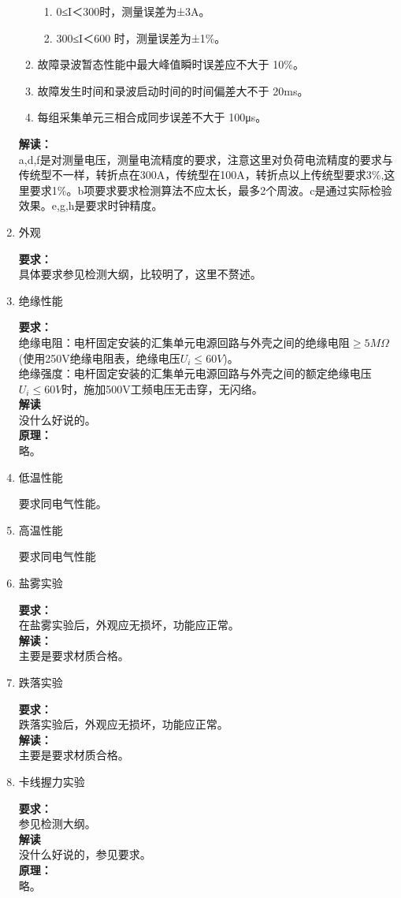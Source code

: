 \documentclass{article}
\begin{document}
\begin{CJK}{UTF8}{gbsn}
\begin{enumerate}
\begin{enumerate}
					\begin{enumerate}	
						\item 0≤I＜300时，测量误差为±3A。 
						\item 300≤I＜600 时，测量误差为±1\%。 
					\end{enumerate}
				\item 故障录波暂态性能中最大峰值瞬时误差应不大于 10\%。 
				\item 故障发生时间和录波启动时间的时间偏差大不于 20ms。 
				\item 每组采集单元三相合成同步误差不大于 100μs。 
		\end{enumerate}
		\textbf{解读：}\\
		a,d,f是对测量电压，测量电流精度的要求，注意这里对负荷电流精度的要求与传统型不一样，转折点在300A，传统型在100A，转折点以上传统型要求3\%,这里要求1\%。b项要求要求检测算法不应太长，最多2个周波。c是通过实际检验效果。e,g,h是要求时钟精度。
	\item 外观 
	\par
	\textbf{要求：}\\
	具体要求参见检测大纲，比较明了，这里不赘述。

\item 绝缘性能
	\par
	\textbf{要求：}\\
	绝缘电阻：电杆固定安装的汇集单元电源回路与外壳之间的绝缘电阻$\geq 5M\Omega$(使用250V绝缘电阻表，绝缘电压$U_i\leq 60V$)。\\
	绝缘强度：电杆固定安装的汇集单元电源回路与外壳之间的额定绝缘电压$U_i \leq 60V$时，施加500V工频电压无击穿，无闪络。\\
	\textbf{解读}\\
	没什么好说的。\\
	\textbf{原理：}\\
	略。

\item 低温性能
	\par
	要求同电气性能。
\item 高温性能
	\par
	要求同电气性能
\item 盐雾实验
	\par
	\textbf{要求：}\\
	在盐雾实验后，外观应无损坏，功能应正常。\\
	\textbf{解读：}\\
	主要是要求材质合格。
\item 跌落实验
	\par
	\textbf{要求：}\\
	跌落实验后，外观应无损坏，功能应正常。\\
	\textbf{解读：}\\
	主要是要求材质合格。
\item 卡线握力实验
	\par
	\textbf{要求：}\\
	参见检测大纲。\\
	\textbf{解读}\\
	没什么好说的，参见要求。\\
	\textbf{原理：}\\
	略。


\end{enumerate}
\end{CJK}
\end{document}

